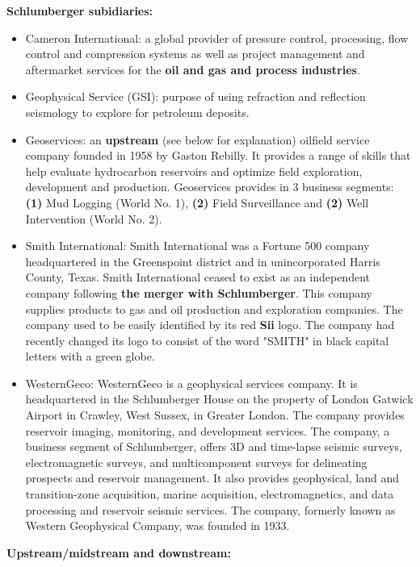 \documentclass[12pt,a4paper]{report}
\begin{document}
\textbf{Schlumberger subidiaries:}
\begin{itemize}[noitemsep,topsep=0pt]
\item Cameron International: a global provider of pressure control,
  processing, flow control and compression systems as well as project
  management and aftermarket services for the \textbf{oil and gas and
    process industries}.
\item Geophysical Service (GSI): purpose of using refraction and reflection
  seismology to explore for petroleum deposits.
\item Geoservices: an \textbf{upstream} (see below for explanation) oilfield
  service company founded in 1958 by Gaston Rebilly. It provides a range of
  skills that help evaluate hydrocarbon reservoirs and optimize field
  exploration, development and production. Geoservices provides in 3
  business segments: \textbf{(1)} Mud Logging (World No. 1), \textbf{(2)}
  Field Surveillance and \textbf{(2)} Well Intervention (World No. 2).
\item Smith International: Smith International was a Fortune 500 company
  headquartered in the Greenspoint district and in unincorporated Harris
  County, Texas. Smith International ceased to exist as an independent
  company following \textbf{the merger with Schlumberger}. This company
  supplies products to gas and oil production and exploration companies. The
  company used to be easily identified by its red \textbf{Sii} logo. The
  company had recently changed its logo to consist of the word "SMITH" in
  black capital letters with a green globe.
\item WesternGeco: WesternGeco is a geophysical services company. It is
  headquartered in the Schlumberger House on the property of London Gatwick
  Airport in Crawley, West Sussex, in Greater London. The company provides
  reservoir imaging, monitoring, and development services. The company, a
  business segment of Schlumberger, offers 3D and time-lapse seismic
  surveys, electromagnetic surveys, and multicomponent surveys for
  delineating prospects and reservoir management. It also provides
  geophysical, land and transition-zone acquisition, marine acquisition,
  electromagnetics, and data processing and reservoir seismic services. The
  company, formerly known as Western Geophysical Company, was founded in
  1933.
\end{itemize}

\textbf{Upstream/midstream and downstream:}
\end{document}
